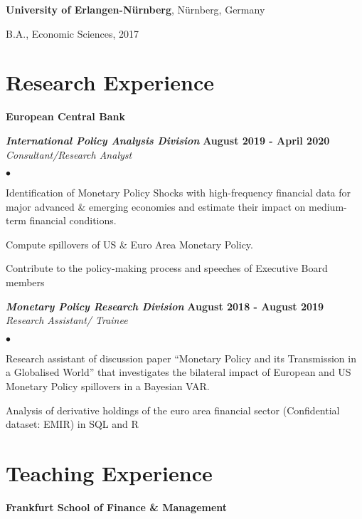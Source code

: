 \documentclass[margin,line]{res}
\newenvironment{list1}{
  \begin{list}{\ding{113}}{%
      \setlength{\itemsep}{0in}
      \setlength{\parsep}{0in} \setlength{\parskip}{0in}
      \setlength{\topsep}{0in} \setlength{\partopsep}{0in} 
      \setlength{\leftmargin}{0.17in}}}{\end{list}}
\newenvironment{list2}{
  \begin{list}{$\bullet$}{%
      \setlength{\itemsep}{0in}
      \setlength{\parsep}{0in} \setlength{\parskip}{0in}
      \setlength{\topsep}{0in} \setlength{\partopsep}{0in} 
      \setlength{\leftmargin}{0.2in}}}{\end{list}}
\begin{document}
\begin{resume}
{\bf University of Erlangen-Nürnberg}, Nürnberg, Germany\\
\vspace*{-.1in}
\begin{list1}
\item[] B.A., Economic Sciences,  2017
\end{list1}




\section{\sc Research Experience}
{\bf European Central Bank}
\vspace{-.3cm}

{\bf \em International Policy Analysis Division}
 \hfill {\bf August 2019 - April 2020}\\
 {\em Consultant/Research Analyst}\\
\begin{list2}
  \item Identification of Monetary Policy Shocks with high-frequency financial data for major advanced \& emerging economies and estimate their impact on medium-term financial conditions.
  \item Compute spillovers of US \& Euro Area Monetary Policy. 
  \item Contribute to the policy-making process and speeches of Executive Board members
\end{list2}


{\bf \em Monetary Policy Research Division}
 \hfill {\bf August 2018 - August 2019}\\
 {\em Research Assistant/ Trainee}\\
\begin{list2}
  \item Research assistant of discussion paper “Monetary Policy and its Transmission in a Globalised World” that investigates the bilateral impact of European and US Monetary Policy spillovers in a Bayesian VAR. 
  \item Analysis of derivative holdings of the euro area financial sector (Confidential dataset: EMIR) in SQL and R
\end{list2}


\section{\sc Teaching Experience}
{\bf Frankfurt School of Finance \& Management}


\end{resume}
\end{document}
